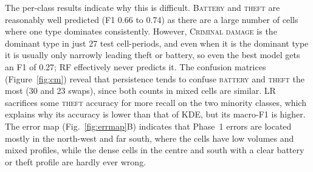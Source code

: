\documentclass[11pt,a4paper]{report}
\begin{document}
\begin{table}[H]
\centering\scriptsize
\caption{Phase~1 test results (periods 11--12; $n=303$; support: battery 136, criminal damage 27, theft 111, other 29). Mean $\pm$ sd over 10 seeds where stochastic}
\label{tab:p1}
\end{table}

The per-class results indicate why this is difficult. \textsc{Battery} and \textsc{theft} are reasonably well predicted (F1 0.66 to 0.74) as there are a large number of cells where one type dominates consistently. However, \textsc{Criminal damage} is the dominant type in just 27 test cell-periods, and even when it is the dominant type it is usually only narrowly leading theft or battery, so even the best model gets an F1 of 0.27; RF effectively never predicts it. The confusion matrices (Figure~\ref{fig:cm}) reveal that persistence tends to confuse \textsc{battery} and \textsc{theft} the most (30 and 23 swaps), since both counts in mixed cells are similar. LR sacrifices some \textsc{theft} accuracy for more recall on the two minority classes, which explains why its accuracy is lower than that of KDE, but its macro-F1 is higher. The error map (Fig.~\ref{fig:errmap}B) indicates that Phase~1 errors are located mostly in the north-west and far south, where the cells have low volumes and mixed profiles, while the dense cells in the centre and south with a clear battery or theft profile are hardly ever wrong.
\end{document}

